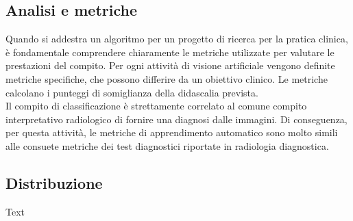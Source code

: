 \documentclass[12pt,a4paper]{report}
\begin{document}
\subsection{Analisi e metriche}
Quando si addestra un algoritmo per un progetto di ricerca per la pratica clinica, è fondamentale comprendere chiaramente le metriche utilizzate per valutare le prestazioni del compito. Per ogni attività di visione artificiale vengono definite metriche specifiche, che possono differire da un obiettivo clinico. Le metriche calcolano i punteggi di somiglianza della didascalia prevista.\\
Il compito di classificazione è strettamente correlato al comune compito interpretativo radiologico di fornire una diagnosi dalle immagini. Di conseguenza, per questa attività, le metriche di apprendimento automatico sono molto simili alle consuete metriche dei test diagnostici riportate in radiologia diagnostica.

\subsection{Distribuzione}
Text
\end{document}
